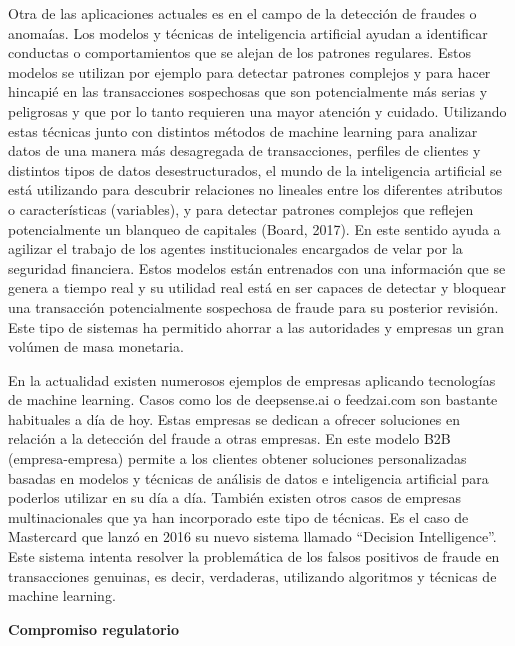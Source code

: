 \documentclass[]{DissertateUSU}
\begin{document}
\noindent Otra de las aplicaciones actuales es en el campo de la
detección de fraudes o anomaías. Los modelos y técnicas de inteligencia
artificial ayudan a identificar conductas o comportamientos que se
alejan de los patrones regulares. Estos modelos se utilizan por ejemplo
para detectar patrones complejos y para hacer hincapié en las
transacciones sospechosas que son potencialmente más serias y peligrosas
y que por lo tanto requieren una mayor atención y cuidado. Utilizando
estas técnicas junto con distintos métodos de machine learning para
analizar datos de una manera más desagregada de transacciones, perfiles
de clientes y distintos tipos de datos desestructurados, el mundo de la
inteligencia artificial se está utilizando para descubrir relaciones no
lineales entre los diferentes atributos o características (variables), y
para detectar patrones complejos que reflejen potencialmente un blanqueo
de capitales (Board, 2017). En este sentido ayuda a agilizar el trabajo
de los agentes institucionales encargados de velar por la seguridad
financiera. Estos modelos están entrenados con una información que se
genera a tiempo real y su utilidad real está en ser capaces de detectar
y bloquear una transacción potencialmente sospechosa de fraude para su
posterior revisión. Este tipo de sistemas ha permitido ahorrar a las
autoridades y empresas un gran volúmen de masa monetaria.

\setlength\parskip{5ex}

\noindent En la actualidad existen numerosos ejemplos de empresas
aplicando tecnologías de machine learning. Casos como los de
deepsense.ai o feedzai.com son bastante habituales a día de hoy. Estas
empresas se dedican a ofrecer soluciones en relación a la detección del
fraude a otras empresas. En este modelo B2B (empresa-empresa) permite a
los clientes obtener soluciones personalizadas basadas en modelos y
técnicas de análisis de datos e inteligencia artificial para poderlos
utilizar en su día a día. También existen otros casos de empresas
multinacionales que ya han incorporado este tipo de técnicas. Es el caso
de Mastercard que lanzó en 2016 su nuevo sistema llamado ``Decision
Intelligence''. Este sistema intenta resolver la problemática de los
falsos positivos de fraude en transacciones genuinas, es decir,
verdaderas, utilizando algoritmos y técnicas de machine learning.

\textbf{Compromiso regulatorio}
\end{document}
